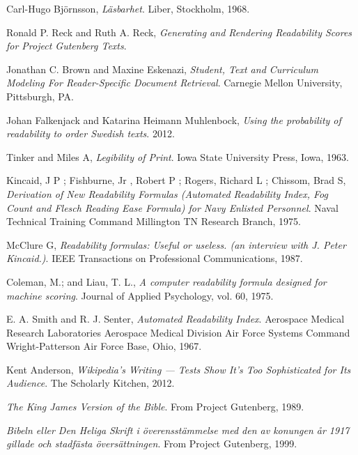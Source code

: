 \documentclass[a4paper]{article}
\begin{document}
\newpage
\begin{thebibliography}{99}

  Carl-Hugo Björnsson,
  \emph{Läsbarhet}.
  Liber, Stockholm,
  1968.
  
  Ronald P. Reck and Ruth A. Reck,
  \emph{Generating and Rendering Readability Scores for Project Gutenberg Texts}.
  
  Jonathan C. Brown and Maxine Eskenazi,
  \emph{Student, Text and Curriculum Modeling For Reader-Specific Document Retrieval}.
  Carnegie Mellon University,
  Pittsburgh, PA.

  Johan Falkenjack and Katarina Heimann Muhlenbock,
  \emph{Using the probability of readability to order Swedish texts}.
  2012.
  
  Tinker and Miles A,
  \emph{Legibility of Print}.
  Iowa State University Press, Iowa,
  1963.
  
  Kincaid, J P ; Fishburne, Jr , Robert P ; Rogers, Richard L ; Chissom, Brad S,
  \emph{Derivation of New Readability Formulas (Automated Readability Index, Fog Count and Flesch Reading Ease Formula) for Navy Enlisted Personnel}.
  Naval Technical Training Command Millington TN Research Branch,
  1975.

  McClure G,
  \emph{Readability formulas: Useful or useless. (an interview with J. Peter Kincaid.)}.
  IEEE Transactions on Professional Communications,
  1987.

  Coleman, M.; and Liau, T. L.,
  \emph{A computer readability formula designed for machine scoring}.
  Journal of Applied Psychology,
  vol. 60,
  1975.
  
  E. A. Smith and R. J. Senter,
  \emph{Automated Readability Index}.
  Aerospace Medical Research Laboratories
Aerospace Medical Division
Air Force Systems Command
Wright-Patterson Air Force Base, Ohio,
  1967.

  Kent Anderson,
  \emph{Wikipedia’s Writing — Tests Show It’s Too Sophisticated for Its Audience}.
  The Scholarly Kitchen,
  2012.

  \emph{The King James Version of the Bible}.
  From Project Gutenberg,
  1989.

  \emph{Bibeln eller Den Heliga Skrift i överensstämmelse med den av
konungen år 1917 gillade och stadfästa översättningen}.
  From Project Gutenberg,
  1999.


\end{thebibliography}
\end{document}
